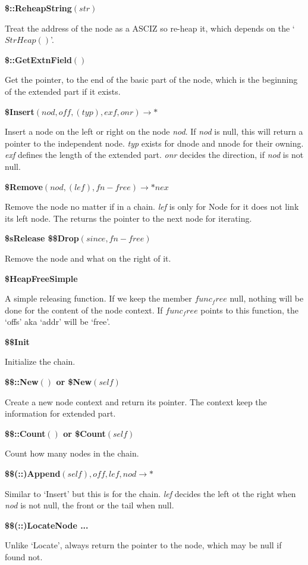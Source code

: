 \textbf{\$::ReheapString$(str)$}

Treat the address of the node as a ASCIZ so re-heap it, which depends on the `$StrHeap()$'. 


\textbf{\$::GetExtnField$()$}

Get the pointer, to the end of the basic part of the node, which is the beginning of the extended part if it exists.


\textbf{\$Insert$(nod,off,(typ),exf,onr)\rightarrow*$}

Insert a node on the left or right on the node \textit{nod}. If \textit{nod} is null, this will return a pointer to the independent node. \textit{typ} exists for dnode and nnode for their owning. \textit{exf} defines the length of the extended part. \textit{onr} decides the direction, if \textit{nod} is not null.


\textbf{\$Remove$(nod,(lef),fn-free)\rightarrow*nex$} 

Remove the node no matter if in a chain. \textit{lef} is only for Node for it does not link its left node. The returns the pointer to the next node for iterating.


\textbf{\$sRelease \$\$Drop$(since,fn-free)$}

Remove the node and what on the right of it.


\textbf{\$HeapFreeSimple}

A simple releasing function. If we keep the member $func_free$ null, nothing will be done for the content of the node context. If $func_free$ points to this function, the `offs' aka `addr' will be `free'.


\textbf{\$\$Init}

Initialize the chain.


\textbf{\$\$::New$()$ or \$New$(self)$}

Create a new node context and return its pointer. The context keep the information for extended part.


\textbf{\$\$::Count$()$ or \$Count$(self)$}

Count how many nodes in the chain.


\textbf{\$\$(::)Append$(self),off,lef,nod\rightarrow*$}

Similar to `Insert' but this is for the chain. \textit{lef} decides the left ot the right when \textit{nod} is not null, the front or the tail when null.


\textbf{\$\$(::)LocateNode ...}

Unlike `Locate', always return the pointer to the node, which may be null if found not.


